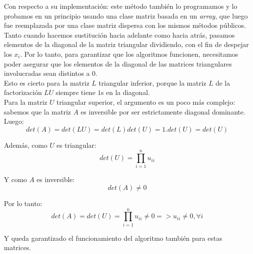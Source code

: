 				Con respecto a su implementación: este método también lo programamos y lo probamos en un principio usando una clase matriz basada en un \textit{array}, que luego fue reemplazada por una clase matriz dispersa con los mismos métodos públicos. \\

				Tanto cuando hacemos sustitución hacia adelante como hacia atrás, pasamos elementos de la diagonal de la matriz triangular dividiendo, con el fin de despejar los $x_i$. Por lo tanto, para garantizar que los algoritmos funcionen, necesitamos poder asegurar que los elementos de la diagonal de las matrices triangulares involucradas sean distintos a $0$. \\

				Esto es cierto para la matriz $L$ triangular inferior, porque la matriz $L$ de la factorización $LU$ siempre tiene $1$s en la diagonal. \\

				Para la matriz $U$ triangular superior, el argumento es un poco más complejo: sabemos que la matriz $A$ es inversible por ser estrictamente diagonal dominante. Luego: \\ %

				\begin{equation}
					det(A) = det(LU) = det(L)det(U) = 1.det(U) = det(U)
				\end{equation}

				Además, como $U$ es triangular: \\

				\begin{equation}
					det(U) = \prod_{i=1}^{n} u_{ii}
				\end{equation}

				Y como $A$ es inversible: \\

				\begin{equation}
					det(A) \neq 0
				\end{equation}

				Por lo tanto: \\

				\begin{equation}
					det(A) = det(U) = \prod_{i=1}^{n} u_{ii} \neq 0 => u_{ii} \neq 0, \forall i
				\end{equation}

				Y queda garantizado el funcionamiento del algoritmo también para estas matrices. \\


